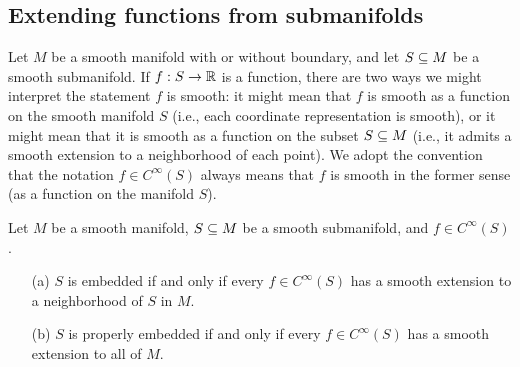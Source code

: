 \subsection{Extending functions from submanifolds}
Let $M$ be a smooth manifold with or without boundary, and let $S\subseteq M$ be a smooth submanifold. If $f:S\to\mathbb{R}$ is a function, there are two ways we might interpret the statement $f$ is smooth: it might mean that $f$ is smooth as a function on the smooth manifold $S$ (i.e., each coordinate representation is smooth), or it might mean that it is smooth as a function on the subset $S\subseteq M$ (i.e., it admits a smooth extension to a neighborhood of each point). We adopt the convention that the notation $f\in C^\infty(S)$ always means that $f$ is smooth in the former sense (as a function on the manifold $S$).
\begin{lemma}\label{ext funct submani}
Let $M$ be a smooth manifold, $S\subseteq M$ be a smooth submanifold, and $f\in C^\infty(S)$.
\begin{itemize}
\item[(a)] $S$ is embedded if and only if every $f\in C^\infty(S)$ has a smooth extension to a neighborhood of $S$ in $M$.
\item[(b)] $S$ is properly embedded if and only if every $f\in C^\infty(S)$ has a smooth extension to all of $M$.
\end{itemize}
\end{lemma}
